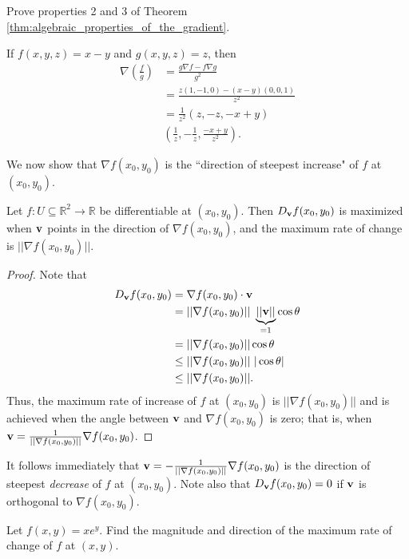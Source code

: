 \documentclass[12pt,letterpaper,reqno]{article}
\numberwithin{equation}{section}
\newcommand{\R}{\ensuremath{\mathbb R}}
\newcommand{\bv}{{\bf v}}
\begin{document}
{\begin{exercise}
Prove properties 2 and 3 of Theorem \ref{thm:algebraic_properties_of_the_gradient}.	
\end{exercise}

\begin{example}
If $f(x,y,z)=x-y$ and $g(x,y,z)=z$, then
\begin{align*}
	\nabla\left(\frac{f}{g}\right)&=\frac{g \nabla f-f \nabla g}{g^2} \\
	&=\frac{z(1,-1,0)-(x-y)(0,0,1)}{z^2} \\
	&=\frac{1}{z^2}(z,-z,-x+y) \\
	&(\frac{1}{z},-\frac{1}{z},\frac{-x+y}{z^2}).
\end{align*}	
\end{example}

We now show that $\nabla f(x_0,y_0)$ is the ``direction of steepest increase" of $f$ at $(x_0,y_0)$.

\begin{thm}
Let $f:U \subseteq \R^2 \to \R$ be differentiable at $(x_0,y_0)$. Then $D_\bv f(x_0,y_0)$ is maximized when $\bv$ points in the direction of $\nabla f(x_0,y_0)$, and the maximum rate of change is $||\nabla f(x_0,y_0)||$.	
\end{thm}

\begin{proof}
	Note that
	\begin{align*}
		D_\bv f(x_0,y_0)&=\nabla f(x_0,y_0) \cdot \bv \\
		&=||\nabla f(x_0,y_0)|| \ \underbrace{||\bv||}_{=1} \cos \theta \\
		&=||\nabla f(x_0,y_0)|| \cos \theta \\ 
		&\leq ||\nabla f(x_0,y_0)|| \ |\cos \theta| \\
		&\leq ||\nabla f(x_0,y_0)||.
	\end{align*}
	Thus, the maximum rate of increase of $f$ at $(x_0,y_0)$ is $||\nabla f(x_0,y_0)||$ and is achieved when the angle between $\bv$ and $\nabla f(x_0,y_0)$ is zero; that is, when $\bv=\frac{1}{||\nabla f(x_0,y_0)||} \nabla f(x_0,y_0)$.
\end{proof}
It follows immediately that $\bv=-\frac{1}{||\nabla f(x_0,y_0)||} \nabla f(x_0,y_0)$ is the direction of steepest \emph{decrease} of $f$ at $(x_0,y_0)$. Note also that $D_\bv f(x_0,y_0)=0$ if $\bv$ is orthogonal to $\nabla f(x_0,y_0)$.

\begin{exercise}
Let $f(x,y)=xe^y$. Find the magnitude and direction of the maximum rate of change of $f$ at $(x,y)$.
\end{exercise}

}
\end{document}
